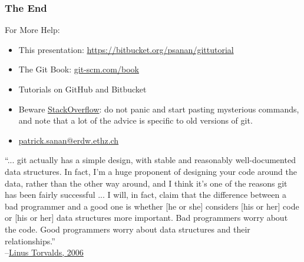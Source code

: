 \documentclass{beamer}
\begin{document}
\begin{frame}[fragile]
\frametitle{The End}

For More Help:
\begin{itemize}
\item This presentation: \href{https://bitbucket.org/psanan/gittutorial}{https://bitbucket.org/psanan/gittutorial}
\item
The Git Book: \href{https://git-scm.com/book}{git-scm.com/book}
\item
Tutorials on GitHub and Bitbucket
\item
Beware \href{https://www.stackoverflow.com}{StackOverflow}: do not panic and start pasting mysterious commands, and note that a lot of the advice is specific to old versions of git.
\item \href{mailto:patrick.sanan@erdw.ethz.ch}{patrick.sanan@erdw.ethz.ch}
\end{itemize}
\vspace{50px}
{\tiny ``... git actually has a simple design, with stable and reasonably well-documented data structures.
In fact, I'm a huge proponent of designing your code around the data, rather than the other
way around, and I think it's one of the reasons git has been fairly successful ... I will, in
fact, claim that the difference between a bad programmer and a good one is whether [he or she]
considers [his or her] code or [his or her] data structures more important. Bad programmers worry
about the code. Good programmers worry about data structures and their relationships.''\\
--\href{http://lwn.net/Articles/193245/}{Linus Torvalds, 2006}
}
\end{frame}
\end{document}
